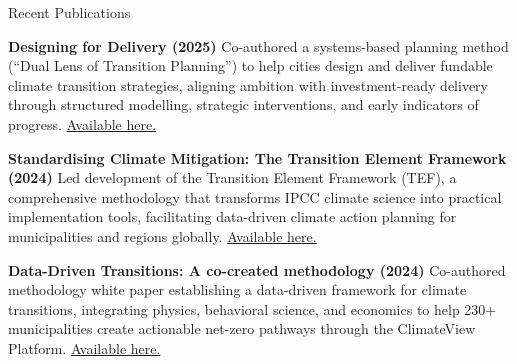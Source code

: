 \documentclass{resume} %
\begin{document}

\newpage
\begin{rSection}{Recent Publications}
  \vspace{-1.25em}
\item \textbf{Designing for Delivery (2025)} {Co-authored a systems-based planning method (``Dual Lens of Transition Planning'') to help cities design and deliver fundable climate transition strategies, aligning ambition with investment-ready delivery through structured modelling, strategic interventions, and early indicators of progress. \href{https://github.com/nitwit-se/cv/blob/483d08a24a34cda01947c78a499fb4de7522bb14/publications/Designing%20for%20Delivery%2020250630.pdf}{Available here.}}

\item \textbf{Standardising Climate Mitigation: The Transition Element Framework (2024)} {Led development of the Transition Element Framework (TEF), a comprehensive methodology that transforms IPCC climate science into practical implementation tools, facilitating data-driven climate action planning for municipalities and regions globally. \href{https://github.com/nitwit-se/cv/blob/483d08a24a34cda01947c78a499fb4de7522bb14/publications/The_Transition_Element_Framework_White_paper_ENG_v5.pdf}{Available here.}}
\item \textbf{Data-Driven Transitions: A co-created methodology (2024)} {Co-authored methodology white paper establishing a data-driven framework for climate transitions, integrating physics, behavioral science, and economics to help 230+ municipalities create actionable net-zero pathways through the ClimateView Platform. \href{https://github.com/nitwit-se/cv/blob/483d08a24a34cda01947c78a499fb4de7522bb14/publications/Data-driven_Transitions_Revised_Edition_White_paper_ENG_v3.pdf}{Available here.}
}
\end{rSection} 
\end{document}
